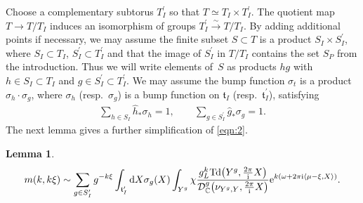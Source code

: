 \documentclass[pdftex]{sigma}
\numberwithin{equation}{section}
\newtheorem{Lemma}[Theorem]{Lemma}
\newcommand{\pair}[2]{\langle #1, #2 \rangle}
\renewcommand{\i}{{\mathrm{i}}}
\def\t{\ensuremath{\mathfrak{t}}}
\def\bC{\ensuremath{\mathbb{C}}}
\def\Td{\ensuremath{\textnormal{Td}}}
\def\calDC{\ensuremath{\mathcal{D}_{\bC}}}
\begin{document}
Choose a complementary subtorus $T_I^\prime$ so that $T\simeq T_I \times T_I^\prime$. The quotient map $T \rightarrow T/T_I$ induces an isomorphism of groups $T_I^\prime \xrightarrow{\sim}T/T_I$.
By adding additional points if necessary, we may assume the finite subset $S\subset T$ is a product $S_I\times S_I^\prime$, where $S_I \subset T_I$, $S_I^\prime \subset T_I^\prime$ and that the image of $S_I^\prime$ in $T/T_I$ contains the set $S_P$ from the introduction. Thus we will write elements of~$S$ as products $hg$ with $h \in S_I \subset T_I$ and $g \in S_I^\prime \subset T_I^\prime$. We may assume the bump function $\sigma_t$ is a product $\sigma_h \cdot \sigma_g$, where $\sigma_h$ (resp.~$\sigma_g$) is a bump function on $\t_I$ (resp.~$\t_I^\prime$), satisfying
\begin{gather}\label{eqn:Sum1}
 \sum_{h \in S_I} \hat{h}_\ast\sigma_h=1, \qquad \sum_{g \in S_I^\prime} \hat{g}_\ast\sigma_g=1.
\end{gather}
The next lemma gives a further simplification of \eqref{eqn:2}.
\begin{Lemma}
\begin{gather}
\label{eqn:Asympt2}
m(k,k\xi)\sim \sum_{g \in S_I^\prime}g^{-k\xi} \int_{\t_I^\prime}{\rm d} X\sigma_g(X) \int_{Y^g} \chi \frac{g_L^k\Td\big(Y^g,\tfrac{2\pi}{\i}X\big)}{\calDC^g\big(\nu_{Y^g,Y},\tfrac{2\pi}{\i}X\big)}{\rm e}^{k(\omega+2\pi \i\pair{\mu-\xi}{X})}.
\end{gather}
\end{Lemma}
\end{document}
